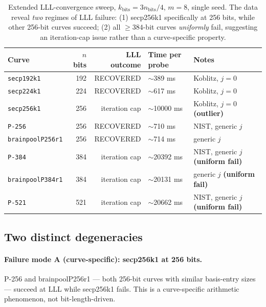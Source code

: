\documentclass[10pt,a4paper]{article}
\begin{document}
\begin{table}[h]
\centering
\begin{tabular}{lrrll}
\toprule
Curve              & $n$ bits & LLL outcome     & Time per probe & Notes \\
\midrule
\texttt{secp192k1} &   192    & RECOVERED       & $\sim$389 ms    & Koblitz, $j=0$ \\
\texttt{secp224k1} &   224    & RECOVERED       & $\sim$617 ms    & Koblitz, $j=0$ \\
\texttt{secp256k1} &   256    & iteration cap   & $\sim$10000 ms  & Koblitz, $j=0$ \textbf{(outlier)} \\
\texttt{P-256}     &   256    & RECOVERED       & $\sim$710 ms    & NIST, generic $j$ \\
\texttt{brainpoolP256r1} & 256 & RECOVERED      & $\sim$714 ms    & generic $j$ \\
\texttt{P-384}     &   384    & iteration cap   & $\sim$20392 ms  & NIST, generic $j$ \textbf{(uniform fail)} \\
\texttt{brainpoolP384r1} & 384 & iteration cap   & $\sim$20131 ms  & generic $j$ \textbf{(uniform fail)} \\
\texttt{P-521}     &   521    & iteration cap   & $\sim$20662 ms  & NIST, generic $j$ \textbf{(uniform fail)} \\
\bottomrule
\end{tabular}
\caption{Extended LLL-convergence sweep, $k_{\text{bits}} = 3 n_{\text{bits}}/4$,
$m = 8$, single seed. The data reveal \emph{two} regimes of LLL
failure: (1) secp256k1 specifically at 256 bits, while
other 256-bit curves succeed; (2) all $\geq 384$-bit curves
\emph{uniformly} fail, suggesting an iteration-cap issue rather
than a curve-specific property.}
\label{tab:sweep}
\end{table}

\subsection{Two distinct degeneracies}

\paragraph{Failure mode A (curve-specific): secp256k1 at 256 bits.}
P-256 and brainpoolP256r1 — both 256-bit curves with similar
basis-entry sizes — succeed at LLL while secp256k1 fails. This is
a curve-specific arithmetic phenomenon, not bit-length-driven.
\end{document}
